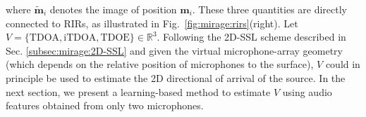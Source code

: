 where $\tilde{\mathbf{m}}_i$ denotes the image of position $\mathbf{m}_i$.
These three quantities are directly connected to RIRs, as illustrated in Fig.~\cref{fig:mirage:rirs}(right).
Let $V = \{ \text{TDOA}, \text{iTDOA}, \text{TDOE}\}\in\mathbb{R}^3$.
Following the 2D-SSL scheme described in Sec. \cref{subsec:mirage:2D-SSL} and
given the virtual microphone-array geometry (which depends on the relative position of microphones to the surface),
$V$ could in principle be used to estimate the 2D directional of arrival of the source.
In the next section, we present a learning-based method to estimate
$V$ using audio features obtained from only two microphones.


